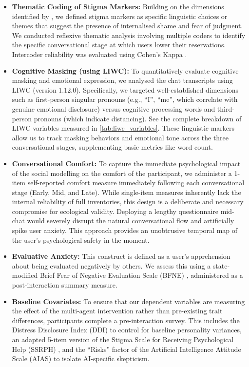 \documentclass[sigconf]{acmart}
\begin{document}
\begin{itemize}
    \item \textbf{Thematic Coding of Stigma Markers:} Building on the dimensions identified by \citet{Meng2026CHALET}, we defined stigma markers as specific linguistic choices or themes that suggest the presence of internalised shame and fear of judgment. We conducted reflexive thematic analysis \cite{Braun2006Thematic} involving multiple coders to identify the specific conversational stage at which users lower their reservations. Intercoder reliability was evaluated using Cohen's Kappa \cite{Cohen1960Kappa}.
    
    \item \textbf{Cognitive Masking (using LIWC):} To quantitatively evaluate cognitive masking and emotional expression, we analysed the chat transcripts using LIWC (version 1.12.0). Specifically, we targeted well-established dimensions such as first-person singular pronouns (e.g., ``I'', ``me'', which correlate with genuine emotional disclosure) versus cognitive processing words and third-person pronouns (which indicate distancing). See the complete breakdown of LIWC variables measured in \autoref{tab:liwc_variables}. These linguistic markers allow us to track masking behaviors and emotional tone across the three conversational stages, supplementing basic metrics like word count.
    
    \item \textbf{Conversational Comfort:} To capture the immediate psychological impact of the social modelling on the comfort of the participant, we administer a 1-item self-reported comfort measure immediately following each conversational stage (Early, Mid, and Late). While single-item measures inherently lack the internal reliability of full inventories, this design is a deliberate and necessary compromise for ecological validity. Deploying a lengthy questionnaire mid-chat would severely disrupt the natural conversational flow and artificially spike user anxiety. This approach provides an unobtrusive temporal map of the user's psychological safety in the moment.
    
    \item \textbf{Evaluative Anxiety:} This construct is defined as a user's apprehension about being evaluated negatively by others. We assess this using a state-modified Brief Fear of Negative Evaluation Scale (BFNE) \cite{Leary1983BFNE}, administered as a post-interaction summary measure.
    
    \item \textbf{Baseline Covariates:} To ensure that our dependent variables are measuring the effect of the multi-agent intervention rather than pre-existing trait differences, participants complete a pre-interaction survey. This includes the Distress Disclosure Index (DDI) \cite{Kahn2001DDI} to control for baseline personality variances, an adapted 5-item version of the Stigma Scale for Receiving Psychological Help (SSRPH) \cite{Pinto2014SSRPH}, and the ``Risks'' factor of the Artificial Intelligence Attitude Scale (AIAS) \cite{Aktay2024AIAS} to isolate AI-specific skepticism.
\end{itemize}
\end{document}
